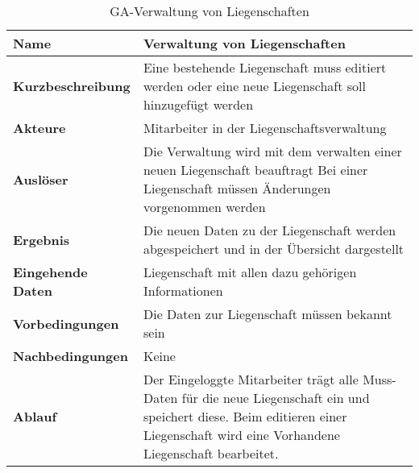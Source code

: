 \begin{table}[H]
  \centering
  \settowidth{}
  \setlength\extrarowheight{2pt}
  \begin{tabulary}{1.0\textwidth}{|a|m{12cm}|}
    \hline
    \textbf{Name}& Verwaltung von Liegenschaften\\
    \hline 
    \textbf{Kurzbeschreibung} & Eine bestehende Liegenschaft muss editiert werden oder eine neue Liegenschaft soll hinzugefügt werden\\
    \hline
    \textbf{Akteure} & Mitarbeiter in der Liegenschaftsverwaltung\\
    \hline
    \textbf{Auslöser} & Die Verwaltung wird mit dem verwalten einer neuen Liegenschaft beauftragt \newline
    Bei einer Liegenschaft müssen Änderungen vorgenommen werden\\
    \hline
    \textbf{Ergebnis} & Die neuen Daten zu der Liegenschaft werden abgespeichert und in der Übersicht dargestellt\\
    \hline
    \textbf{Eingehende Daten} & Liegenschaft mit allen dazu gehörigen Informationen\\
    \hline
    \textbf{Vorbedingungen} & Die Daten zur Liegenschaft müssen bekannt sein\\
    \hline
    \textbf{Nachbedingungen} & Keine\\
    \hline
    \textbf{Ablauf} & Der Eingeloggte Mitarbeiter trägt alle Muss-Daten für die neue Liegenschaft ein und speichert diese. \newline
    Beim editieren einer Liegenschaft wird eine Vorhandene Liegenschaft bearbeitet.\\
    \hline
  \end{tabulary}
  \caption{GA-Verwaltung von Liegenschaften}
\end{table}

